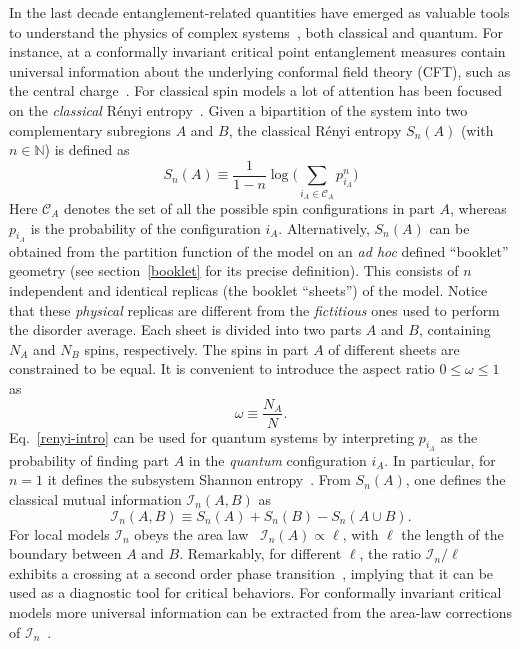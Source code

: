 \documentclass[twocolumn,superscriptaddress,prb,10pt]{revtex4-1}
\begin{document}
In the last decade entanglement-related quantities have emerged as valuable tools to 
understand the physics of complex systems~\cite{amico-2008,eisert-2009,calabrese-2009,
cc-rev}, both classical and quantum. For instance, at a conformally invariant critical 
point entanglement measures contain universal information about the underlying 
conformal field theory (CFT), such as the central charge~\cite{holzhey-1994,vidal-2003,
calabrese-2004,calabrese-2012}. For classical spin models a lot of attention has been 
focused on the \emph{classical} R\'enyi entropy~\cite{jaconis-2013,stephan-2014}. Given 
a bipartition of the system into two complementary subregions $A$ and $B$, the classical 
R\'enyi entropy $S_n(A)$ (with $n\in\mathbb{N}$) is defined as 
%
\begin{equation}
S_n(A)\equiv \frac{1}{1-n}\log\Big(\sum\limits_{i_A\in{\mathcal C}_A} p^n_{i_A}
\Big)
\label{renyi-intro}
\end{equation}
%
Here ${\mathcal C}_A$ denotes the set of all the possible spin configurations in part 
$A$, whereas $p_{i_A}$ is the probability of the configuration $i_A$. 
Alternatively, $S_n(A)$ can be obtained from the partition function of the model on 
an \emph{ad hoc} defined ``booklet'' geometry (see section~\ref{booklet} for its 
precise definition). This consists of $n$ independent and identical replicas (the 
booklet ``sheets'') of the model. Notice that these \emph{physical} replicas are different 
from the \emph{fictitious} ones used to perform the disorder average. Each sheet is 
divided into two parts $A$ and $B$, containing $N_A$ and $N_B$ spins, respectively. 
The spins in part $A$ of different sheets are constrained to be equal. It is 
convenient to introduce the aspect ratio $0\le\omega\le1$ as  
%
\begin{equation}
\label{a-ratio}
\omega\equiv \frac{N_A}{N}.
\end{equation}
%
Eq.~\eqref{renyi-intro} can be used for quantum systems by interpreting $p_{i_A}$ as 
the probability of finding part $A$ in the \emph{quantum} configuration $i_A$. In particular, 
for $n=1$ it defines the subsystem Shannon entropy~\cite{alcaraz-2013,stephan-2014-a}. 
From $S_n(A)$, one defines the classical mutual information ${\mathcal I}_n(A,B)$ 
as 
%
\begin{equation}
{\mathcal I}_n(A,B)\equiv S_n(A)+S_n(B)-S_n(A\cup B). 
\end{equation}
%
For local models ${\mathcal I}_n$ obeys the area law~\cite{wolf-2008} ${\mathcal I}_n(A)
\propto\ell$, with $\ell$ the length of the boundary between $A$ and $B$. Remarkably, 
for different $\ell$, the ratio ${\mathcal I}_n/\ell$ exhibits a crossing at a second 
order phase transition~\cite{jaconis-2013}, implying that it can be used as a diagnostic 
tool for critical behaviors. For conformally invariant critical models more universal 
information can be extracted from the area-law corrections of ${\mathcal I}_n$~\cite{stephan-2014}. 
\end{document}
